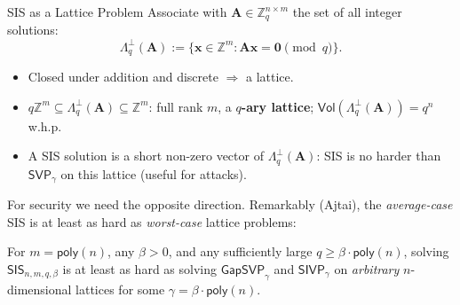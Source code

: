 \documentclass{zkdl-presentation-template}
\begin{document}
    \begin{frame}{SIS as a Lattice Problem}
        Associate with $\mathbf{A} \in \mathbb{Z}_q^{n \times m}$ the set of all integer solutions:
        \begin{equation*}
            \Lambda^{\perp}_q(\mathbf{A}) := \{\mathbf{x} \in \mathbb{Z}^m: \mathbf{A}\mathbf{x} = \mathbf{0} \pmod{q}\}.
        \end{equation*}
        \vspace{-15pt}
        \begin{itemize}
            \item Closed under addition and discrete $\Rightarrow$ a lattice.
            \item $q\mathbb{Z}^m \subseteq \Lambda^{\perp}_q(\mathbf{A}) \subseteq \mathbb{Z}^m$: full rank $m$, a \textbf{$q$-ary lattice}; $\mathsf{Vol}(\Lambda^{\perp}_q(\mathbf{A})) = q^n$ w.h.p.\pause
            \item A SIS solution is a short non-zero vector of $\Lambda^{\perp}_q(\mathbf{A})$: SIS is no harder than $\mathsf{SVP}_{\gamma}$ on this lattice (useful for attacks).
        \end{itemize}
        \pause

        For security we need the opposite direction. Remarkably (Ajtai), the \emph{average-case} SIS is at least as hard as \emph{worst-case} lattice problems:
        \begin{theorem}[Informal]
            For $m = \mathsf{poly}(n)$, any $\beta > 0$, and any sufficiently large $q \geq \beta \cdot \mathsf{poly}(n)$, solving $\mathsf{SIS}_{n,m,q,\beta}$ is at least as hard as solving $\mathsf{GapSVP}_{\gamma}$ and $\mathsf{SIVP}_{\gamma}$ on \emph{arbitrary} $n$-dimensional lattices for some $\gamma = \beta \cdot \mathsf{poly}(n)$.
        \end{theorem}
    \end{frame}
\end{document}
